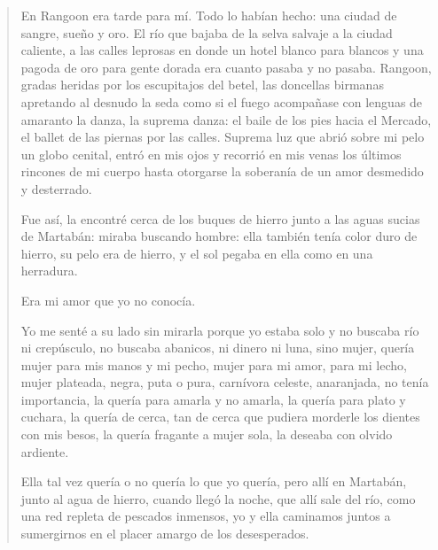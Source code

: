 \documentclass[12pt]{article}
\begin{document}
\clearpage
{}
\begin{verse}
En Rangoon era tarde para mí.  
Todo lo habían hecho:  
una ciudad  
de sangre,  
sueño y oro.  
El río que bajaba  
de la selva salvaje  
a la ciudad caliente,  
a las calles leprosas  
en donde un hotel blanco para blancos  
y una pagoda de oro para gente dorada  
era cuanto  
pasaba  
y no pasaba.  
Rangoon, gradas heridas  
por los escupitajos  
del betel,  
las doncellas birmanas  
apretando al desnudo  
la seda  
como si el fuego acompañase  
con lenguas de amaranto  
la danza, la suprema  
danza:  
el baile de los pies hacia el Mercado,  
el ballet de las piernas por las calles.  
Suprema luz que abrió sobre mi pelo  
un globo cenital, entró en mis ojos  
y recorrió en mis venas  
los últimos rincones de mi cuerpo  
hasta otorgarse la soberanía  
de un amor desmedido y desterrado.  

Fue así, la encontré cerca  
de los buques de hierro  
junto a las aguas sucias  
de Martabán: miraba  
buscando hombre:  
ella también tenía  
color duro de hierro,  
su pelo era de hierro,  
y el sol pegaba en ella como en una herradura.  

Era mi amor que yo no conocía.  

Yo me senté a su lado  
sin mirarla  
porque yo estaba solo  
y no buscaba río ni crepúsculo,  
no buscaba abanicos,  
ni dinero ni luna,  
sino mujer, quería  
mujer para mis manos y mi pecho,  
mujer para mi amor, para mi lecho,  
mujer plateada, negra, puta o pura,  
carnívora celeste, anaranjada,  
no tenía importancia,  
la quería para amarla y no amarla,  
la quería para plato y cuchara,  
la quería de cerca, tan de cerca  
que pudiera morderle los dientes con mis besos,  
la quería fragante a mujer sola,  
la deseaba con olvido ardiente.  

Ella tal vez quería  
o no quería lo que yo quería,  
pero allí en Martabán, junto al agua de hierro,  
cuando llegó la noche, que allí sale del río,  
como una red repleta de pescados inmensos,  
yo y ella caminamos juntos a sumergirnos  
en el placer amargo de los desesperados.  

\end{verse}
\end{document}
